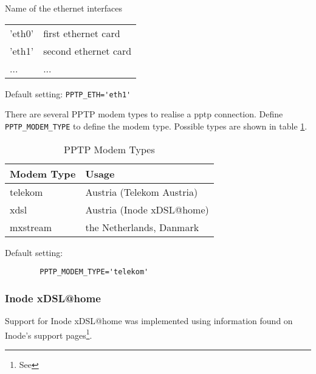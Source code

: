 \begin{description}
 
   


Name of the ethernet interfaces

\begin{tabular}[h!]{ll}
  'eth0' & first ethernet card\\
  'eth1' & second ethernet card\\
  ...   &  ...\\
\end{tabular}
        
Default setting: \verb*?PPTP_ETH='eth1'?


There are several PPTP modem types to realise a pptp connection. 
Define \verb*?PPTP_MODEM_TYPE? to define the modem type. Possible 
types are shown in table \ref{tab:pptp-modemtypen}.

\begin{table}[htb]
  \centering
  \begin{tabular}{l|l}
    Modem Type & Usage\\
    \hline
    telekom & Austria (Telekom Austria) \\
    xdsl & Austria (Inode xDSL@home) \\
    mxstream & the Netherlands, Danmark
  \end{tabular}
  \caption{PPTP Modem Types}
  \label{tab:pptp-modemtypen}
\end{table}

        Default setting:

\begin{example}
\begin{verbatim}
        PPTP_MODEM_TYPE='telekom'
\end{verbatim}
\end{example}

\end{description}

\subsubsection{Inode xDSL@home}

Support for Inode xDSL@home was implemented using information 
found on Inode's support pages\footnote{See
  }.

